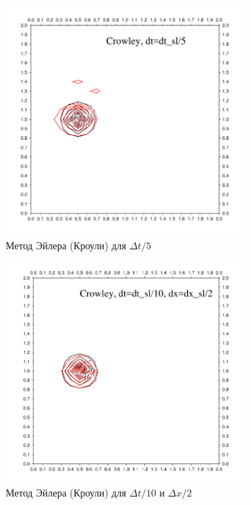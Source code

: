 %
%
\begin{figure}[ht] 
	\centering
	\includegraphics[width=0.8\textwidth,height=0.8\textwidth]{images/6_10}
	\caption{Метод Эйлера (Кроули) для $\Delta t/5$}
	\label{img:6_10}
\end{figure}
%
%
\begin{figure}[ht] 
	\centering
	\includegraphics[width=0.8\textwidth,height=0.8\textwidth]{images/6_11}
	\caption{Метод Эйлера (Кроули) для $\Delta t/10$ и $\Delta x/2$}
	\label{img:6_11}
\end{figure}
%
